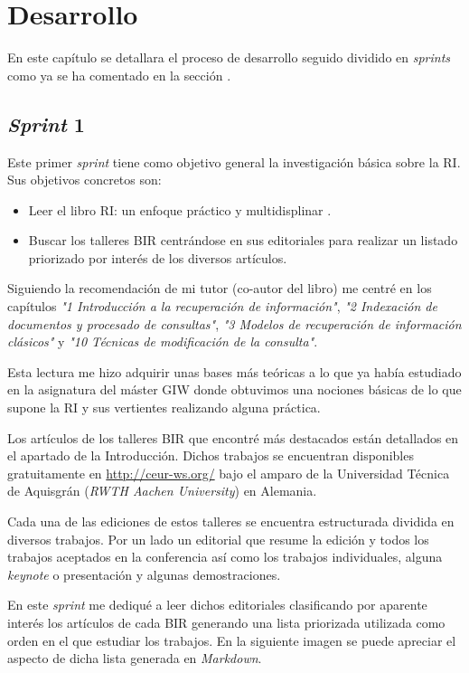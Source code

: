 \chapter{Desarrollo}
En este capítulo se detallara el proceso de desarrollo seguido dividido en \textit{sprints} como ya se ha comentado en la sección .


\section{\textit{Sprint} 1}
Este primer \textit{sprint} tiene como objetivo general la investigación básica sobre la \acrshort{RI}. Sus objetivos concretos son: 

\begin{itemize}
	\item Leer el libro \acrlong{RI}: un enfoque práctico y multidisplinar \cite{RIspaBook}.
	\item Buscar los talleres \acrshort{BIR} centrándose en sus editoriales para realizar un listado priorizado por interés de los diversos artículos.
\end{itemize}

Siguiendo la recomendación de mi tutor (co-autor del libro) me centré en los capítulos \textit{"1 Introducción a la recuperación de información"}, \textit{"2 Indexación de documentos y procesado de consultas"}, \textit{"3 Modelos de recuperación de información clásicos"} y \textit{"10 Técnicas de modificación de la consulta"}. 

Esta lectura me hizo adquirir unas bases más teóricas a lo que ya había estudiado en la asignatura del máster \acrlong{GIW} donde obtuvimos una nociones básicas de lo que supone la \acrshort{RI} y sus vertientes realizando alguna práctica.

Los artículos de los talleres \acrlong{BIR} que encontré más destacados están detallados en el apartado  de la Introducción. Dichos trabajos se encuentran disponibles gratuitamente en \url{http://ceur-ws.org/} bajo el amparo de la Universidad Técnica de Aquisgrán (\textit{RWTH Aachen University}) en Alemania.

Cada una de las ediciones de estos talleres se encuentra estructurada dividida en diversos trabajos. Por un lado un editorial que resume la edición y todos los trabajos aceptados en la conferencia así como los trabajos individuales, alguna \textit{keynote} o presentación y algunas demostraciones. 

En este \textit{sprint} me dediqué a leer dichos editoriales clasificando por aparente interés los artículos de cada \acrshort{BIR} generando una lista priorizada utilizada como orden en el que estudiar los trabajos. En la siguiente imagen se puede apreciar el aspecto de dicha lista generada en \textit{Markdown}.

